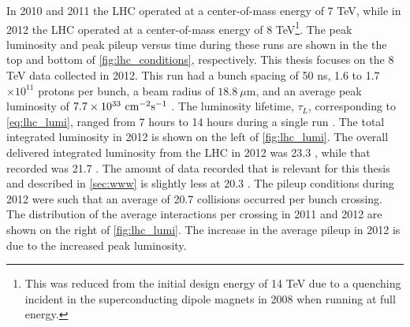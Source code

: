 In 2010 and 2011 the LHC operated at a center-of-mass energy of 7 TeV, while
in 2012 the LHC operated at a center-of-mass energy of 8 TeV\footnote{This
was reduced from the initial design energy of 14 TeV due to a quenching incident
in the superconducting dipole magnets in 2008 when running at full energy.}.
The peak luminosity and peak pileup versus time during these runs
are shown in the the top and bottom of \fig\ref{fig:lhc_conditions}, respectively.
This thesis focuses on the 8 TeV data collected in 2012.
This run had 
a bunch spacing of 50 ns, 1.6 to 1.7 $\times 10^{11}$ protons
per bunch, a beam radius of $18.8~\mu$m, and an average peak 
luminosity of $7.7 \times 10^{33}~\textrm{cm}^{-2}\textrm{s}^{-1}$ \cite{Lamont:1709796}.
The luminosity lifetime, $\tau_L$, corresponding to \eqn\eqref{eq:lhc_lumi},
ranged from 7 hours to 14 hours during a single run \cite{Hostettler:2013qya}.
The total integrated luminosity in 2012 is shown 
on the left of \fig\ref{fig:lhc_lumi}.
The overall delivered integrated luminosity from the LHC
in 2012 was 23.3 \ifb, while that recorded was 21.7 \ifb. The 
amount of data recorded that is relevant for this thesis
and described in \sec\ref{sec:www} is slightly less at 20.3 \ifb.
The pileup conditions during 2012 were such that an average
of 20.7 collisions occurred per bunch crossing. The distribution
of the average interactions per crossing in 2011 and 2012 are shown on
the right of \fig\ref{fig:lhc_lumi}. The increase in the average pileup 
in 2012 is due to the increased peak luminosity.




